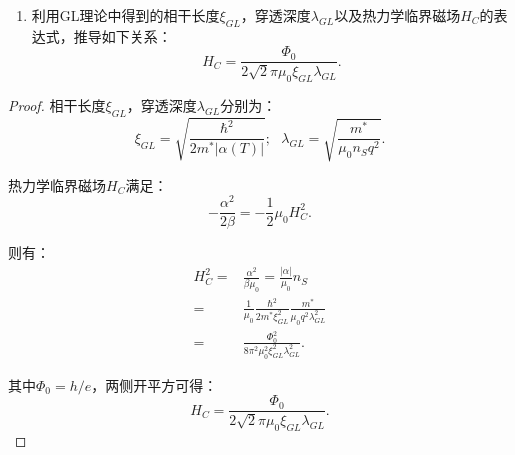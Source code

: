 \documentclass[reqno,a4paper,12pt]{amsart}
\begin{document}
\begin{enumerate}[1.]
\begin{proof}
则当满足边界条件
\[
	\vec{n} \times \left( \frac{1}{\mu_0}\vec{B} - \vec{H} \right) = 0
\]

时，$\delta g$积分中第二项为零，则$\int \delta g d^3\vec{r} = 0$得到：
\[
	\vec{J}_s = \frac{q\hbar}{2mi}(\Psi^*\nabla\Psi - \Psi\nabla\Psi^*) - \frac{q^2}{m^*} \vert \Psi \vert^2 \vec{A} = \frac{q \vert \Psi \vert^2}{m^*} (\hbar\nabla \theta - q\vec{A}).
\]

\end{proof}

\medskip

\item 利用GL理论中得到的相干长度$\xi_{GL}$，穿透深度$\lambda_{GL}$以及热力学临界磁场$H_C$的表达式，推导如下关系：
\[
	H_C = \frac{\Phi_0}{2\sqrt{2}\pi\mu_0\xi_{GL}\lambda_{GL}}.
\]
\end{enumerate}

\begin{proof}

相干长度$\xi_{GL}$，穿透深度$\lambda_{GL}$分别为：
\[
	\xi_{GL} = \sqrt{\frac{\hbar^2}{2m^*\vert \alpha(T) \vert}}; \ \ \ \lambda_{GL} = \sqrt{\frac{m^*}{\mu_0n_Sq^2}}.
\]

热力学临界磁场$H_C$满足：
\[
	-\frac{\alpha^2}{2\beta} = -\frac{1}{2}\mu_0 H_C^2.
\]

则有：
\begin{align*}
	H_C^2 =& \frac{\alpha^2}{\beta\mu_0} = \frac{\vert \alpha \vert}{\mu_0} n_S \\
	=& \frac{1}{\mu_0} \frac{\hbar^2}{2m^*\xi_{GL}^2} \frac{m^*}{\mu_0q^2\lambda_{GL}^2} \\
	=& \frac{\Phi_0^2}{8\pi^2\mu_0^2\xi_{GL}^2\lambda_{GL}^2}.
\end{align*}

其中$\Phi_0 = h/e$，两侧开平方可得：
\[
	H_C = \frac{\Phi_0}{2\sqrt{2}\pi\mu_0\xi_{GL}\lambda_{GL}}.
\]

\end{proof}
\end{document}
